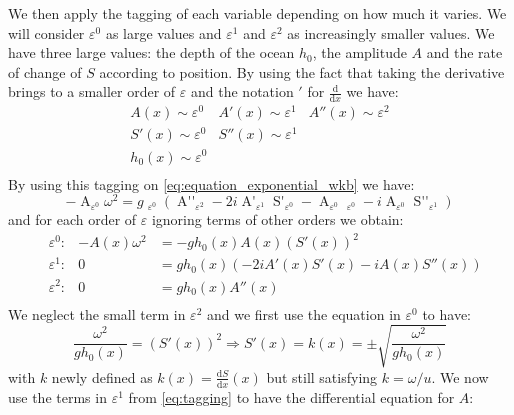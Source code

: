 We then apply the tagging of each variable depending on how much it varies. We will consider $\varepsilon ^0$ as large values and $\varepsilon^1$ and $\varepsilon^2$ as increasingly smaller values. We have three large values: the depth of the ocean $h_0$, the amplitude $A$ and the rate of change of $S$ according to position. By using the fact that taking the derivative brings to a smaller order of $\varepsilon$ and the notation $'$ for $\frac{\mathrm{d}}{\mathrm{d}x}$ we have:
\begin{equation}
    \begin{array}{rrr}
        A(x) \sim \varepsilon^0 & A'(x) \sim \varepsilon^1 & A''(x) \sim \varepsilon^2 \\
        S'(x) \sim \varepsilon^0 & S''(x) \sim \varepsilon^1 & \\
        h_0(x) \sim \varepsilon^0 & & \\
    \end{array}
\end{equation}
By using this tagging on \autoref{eq:equation_exponential_wkb} we have:
\begin{equation}
    -\mathop{A(x)}_{\varepsilon^0}\omega^2 = g\mathop{h_0(x)}_{\varepsilon^0} \left(\mathop{A''(x)}_{\varepsilon^2} - 2i \mathop{A'(x)}_{\varepsilon^1}\mathop{S'(x)}_{\varepsilon^0} - \mathop{A(x)}_{\varepsilon^0}\mathop{\left(S'(x)\right)^2}_{\varepsilon^0} - i\mathop{A(x)}_{\varepsilon^0}\mathop{S''(x)}_{\varepsilon^1}\right)
\end{equation}
and for each order of $\varepsilon$ ignoring terms of other orders we obtain:
\begin{equation}
    \begin{aligned}
        &\varepsilon^0: &-A(x) \omega^2& = -gh_0(x)A(x)(S'(x))^2 \\
        &\varepsilon^1: &0& = gh_0(x)(-2iA'(x)S'(x) - iA(x)S''(x)) \\
        &\varepsilon^2: &0& = gh_0(x) A''(x) \\
    \end{aligned}
    \label{eq:tagging}
\end{equation}
We neglect the small term in $\varepsilon^2$ and we first use the equation in $\varepsilon^0$ to have:
\begin{equation}
    \frac{\omega^2}{gh_0(x)} = (S'(x))^2 \Rightarrow S'(x) = k(x) = \pm \sqrt{\frac{\omega^2}{gh_0(x)}}
    \label{eq:s_prime}
\end{equation}
with $k$ newly defined as $k(x) = \frac{\mathrm{d} S}{\mathrm{d}x}(x)$ but still satisfying $k = \omega / u$. We now use the terms in $\varepsilon^1$ from \autoref{eq:tagging} to have the differential equation for $A$:
